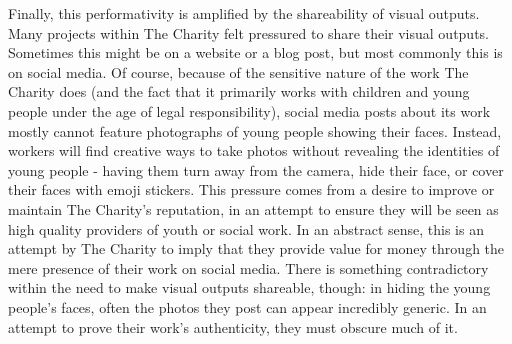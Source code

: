 Finally, this performativity is amplified by the shareability of visual outputs. Many projects within The Charity felt pressured to share their visual outputs. Sometimes this might be on a website or a blog post, but most commonly this is on social media. Of course, because of the sensitive nature of the work The Charity does (and the fact that it primarily works with children and young people under the age of legal responsibility), social media posts about its work mostly cannot feature photographs of young people showing their faces. Instead, workers will find creative ways to take photos without revealing the identities of young people - having them turn away from the camera, hide their face, or cover their faces with emoji stickers. This pressure comes from a desire to improve or maintain The Charity's reputation, in an attempt to ensure they will be seen as high quality providers of youth or social work. In an abstract sense, this is an attempt by The Charity to imply that they provide value for money through the mere presence of their work on social media. There is something contradictory within the need to make visual outputs shareable, though: in hiding the young people's faces, often the photos they post can appear incredibly generic. In an attempt to prove their work's authenticity, they must obscure much of it.

